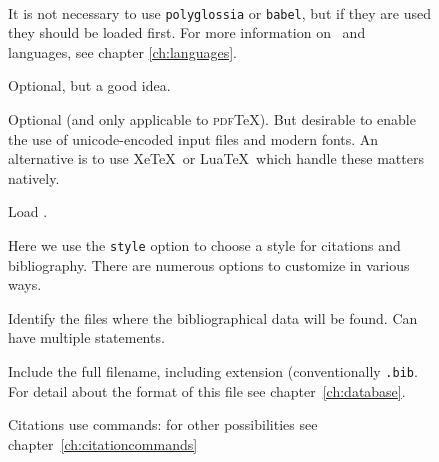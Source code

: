 \begin{figure}
\begin{minipage}[t]{0.7\linewidth}
  \vspace{2pc}
  \colorbox{blue!15}{}\\
  \vspace{1pc}
\end{minipage}%
\begin{minipage}[t]{0.7\linewidth}
  \sffamily\small
  \vspace{1pc}
   It is not necessary to use \texttt{polyglossia} or \texttt{babel},
  but if they are used they should be loaded first. For more
  information on \biblatex\ and languages, see chapter
  \ref{ch:languages}.
  \vspace{1pc}

   Optional,
  but a good idea.

  \vspace{1pc} 
  Optional (and only applicable to \textsc{pdf}\TeX). But
  desirable to enable the use of unicode-encoded input files and
  modern fonts. An alternative is to use Xe\TeX\ or Lua\TeX\, which
  handle these matters natively.

  \vspace{1pc}

   Load \biblatex.
  \vspace{1pc}

  Here we use the
  \texttt{style} option to choose a style for citations
  and
  bibliography. There are numerous options to customize in various ways.

  \vspace{1pc}
  \strut{}
  Identify the files where the bibliographical data will be found. Can
  have multiple  statements.

  \vspace{0.5pc}
   Include the
  full filename, including extension (conventionally
  \texttt{.bib}. For detail about the format of this file see chapter~\ref{ch:database}.

  \vspace{1.3pc}
   Citations use
   commands: for other possibilities see
  chapter~\ref{ch:citationcommands}


\end{minipage}
\end{figure}
